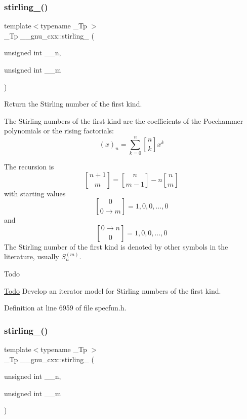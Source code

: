 \subsubsection{\texorpdfstring{stirling\+\_()}{stirling\_1()}}
{\footnotesize\ttfamily template$<$typename \+\_\+\+Tp $>$ \\
\+\_\+\+Tp \+\_\+\+\_\+gnu\+\_\+cxx\+::stirling\+\_ (\begin{DoxyParamCaption}\item[{unsigned int}]{\+\_\+\+\_\+n,  }\item[{unsigned int}]{\+\_\+\+\_\+m }\end{DoxyParamCaption})\hspace{0.3cm}{\ttfamily [inline]}}

Return the Stirling number of the first kind.

The Stirling numbers of the first kind are the coefficients of the Pocchammer polynomials or the rising factorials\+: \[ \newcommand{\stirling}[2]{\genfrac{[}{]}{0pt}{0}{#1}{#2}} (x)_n = \sum_{k=0}^{n} \stirling{n}{k} x^k \]

The recursion is \[ \newcommand{\stirling}[2]{\genfrac{[}{]}{0pt}{0}{#1}{#2}} \stirling{n+1}{m} = \stirling{n}{m-1} - n \stirling{n}{m} \] with starting values \[ \newcommand{\stirling}[2]{\genfrac{[}{]}{0pt}{0}{#1}{#2}} \stirling{0}{0\rightarrow m} = {1, 0, 0, ..., 0} \] and \[ \newcommand{\stirling}[2]{\genfrac{[}{]}{0pt}{0}{#1}{#2}} \stirling{0\rightarrow n}{0} = {1, 0, 0, ..., 0} \] The Stirling number of the first kind is denoted by other symbols in the literature, usually $ S_n^{(m)} $.

\begin{DoxyRefDesc}{Todo}
\item[\hyperlink{todo__todo000004}{Todo}]Develop an iterator model for Stirling numbers of the first kind. \end{DoxyRefDesc}


Definition at line 6959 of file specfun.\+h.

\mbox{\label{group__gnu__math__spec__func_ga3761c0e467cbe45cbda66a4e796adcd3}} 
\subsubsection{\texorpdfstring{stirling\+\_()}{stirling\_2()}}
{\footnotesize\ttfamily template$<$typename \+\_\+\+Tp $>$ \\
\+\_\+\+Tp \+\_\+\+\_\+gnu\+\_\+cxx\+::stirling\+\_ (\begin{DoxyParamCaption}\item[{unsigned int}]{\+\_\+\+\_\+n,  }\item[{unsigned int}]{\+\_\+\+\_\+m }\end{DoxyParamCaption})\hspace{0.3cm}{\ttfamily [inline]}}

